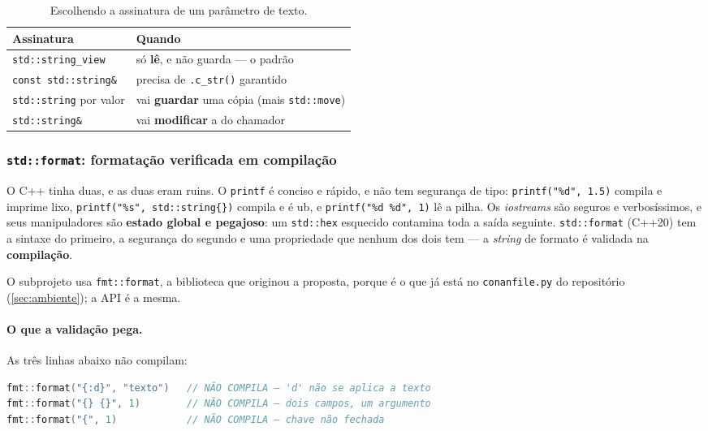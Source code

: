 \begin{table}[htbp]
\centering
\caption{Escolhendo a assinatura de um parâmetro de texto.}
\label{tab:assinatura-texto}
\footnotesize
\begin{tabular}{@{}ll@{}}
\toprule
\textbf{Assinatura} & \textbf{Quando} \\
\midrule
\texttt{std::string\_view}   & só \textbf{lê}, e não guarda --- o padrão \\
\texttt{const std::string\&} & precisa de \texttt{.c\_str()} garantido \\
\texttt{std::string} por valor & vai \textbf{guardar} uma cópia (mais \texttt{std::move}) \\
\texttt{std::string\&}       & vai \textbf{modificar} a do chamador \\
\bottomrule
\end{tabular}
\end{table}

\subsubsection{\texttt{std::format}: formatação verificada em compilação}
\label{sec:format}

\begin{porque}
O C++ tinha duas, e as duas eram ruins. O \texttt{printf} é conciso e rápido, e
não tem segurança de tipo: \texttt{printf("\%d", 1.5)} compila e imprime lixo,
\texttt{printf("\%s", std::string\{\})} compila e é \gls{ub}, e
\texttt{printf("\%d \%d", 1)} lê a pilha. Os \emph{iostreams} são seguros e
verbosíssimos, e seus manipuladores são \textbf{estado global e pegajoso}: um
\texttt{std::hex} esquecido contamina toda a saída seguinte. \texttt{std::format}
(C++20) tem a sintaxe do primeiro, a segurança do segundo e uma propriedade que
nenhum dos dois tem --- a \emph{string} de formato é validada na
\textbf{compilação}.
\end{porque}

O subprojeto usa \texttt{fmt::format}, a biblioteca que originou a proposta,
porque é o que já está no \texttt{conanfile.py} do repositório
(\cref{sec:ambiente}); a API é a mesma.

\paragraph{O que a validação pega.} As três linhas abaixo não compilam:

\begin{lstlisting}[style=bt, language=C++,
    caption={Erros de formato que viram erro de \emph{build}.}]
fmt::format("{:d}", "texto")   // NÃO COMPILA — 'd' não se aplica a texto
fmt::format("{} {}", 1)        // NÃO COMPILA — dois campos, um argumento
fmt::format("{", 1)            // NÃO COMPILA — chave não fechada
\end{lstlisting}

